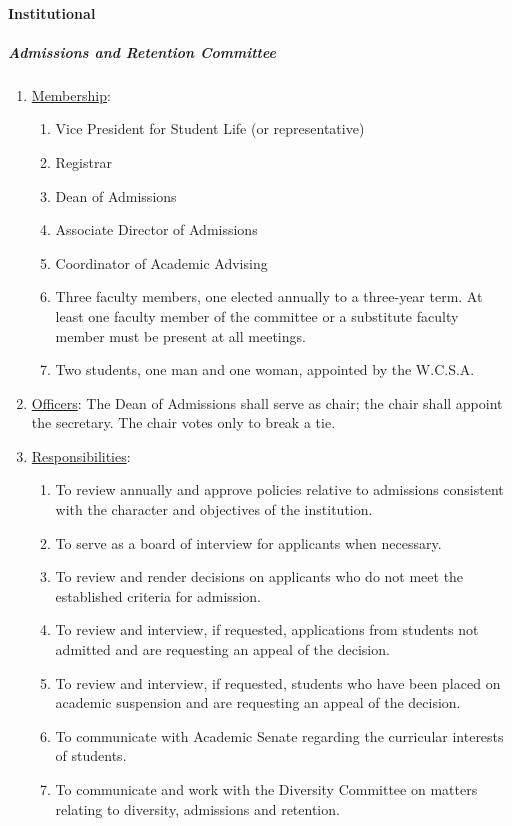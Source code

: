 			\paragraph{Institutional}
				\subparagraph{Admissions and Retention Committee}
					\begin{enumerate}[label=\alph*)]
						\item{\underline{Membership}:
							\begin{enumerate}[label=\arabic*)]
								\item{Vice President for Student Life (or representative)}
								\item{Registrar}
								\item{Dean of Admissions}
								\item{Associate Director of Admissions}
								\item{Coordinator of Academic Advising}
								\item{Three faculty members, one elected annually to a three-year term.  At least one faculty member of the committee or a substitute faculty member must be present at all meetings.}
								\item{Two students, one man and one woman, appointed by the W.C.S.A.}
							\end{enumerate}
						}
						\item{\underline{Officers}:
							The Dean of Admissions shall serve as chair; the chair shall appoint the secretary.  The chair votes only to break a tie.
						}
						\item{\underline{Responsibilities}:
							\begin{enumerate}[label=\arabic*)]
								\item{To review annually and approve policies relative to admissions consistent with the character and objectives of the institution.}
								\item{To serve as a board of interview for applicants when necessary.}
								\item{To review and render decisions on applicants who do not meet the established criteria for admission.}
								\item{To review and interview, if requested, applications from students not admitted and are requesting an appeal of the decision.}
								\item{To review and interview, if requested, students who have been placed on academic suspension and are requesting an appeal of the decision.}
								\item{To communicate with Academic Senate regarding the curricular interests of students.}
								\item{To communicate and work with the Diversity Committee on matters relating to diversity, admissions and retention.}
							\end{enumerate}
						}
					\end{enumerate}
